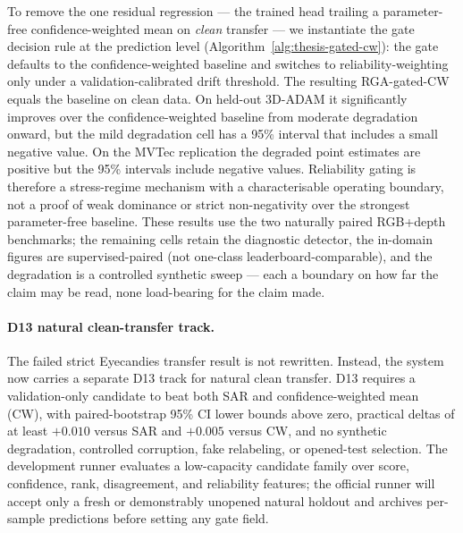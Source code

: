 \documentclass[11pt]{article}
\begin{document}
To remove the one residual regression --- the trained head trailing a
parameter-free confidence-weighted mean on \emph{clean} transfer --- we
instantiate the gate decision rule at the prediction level
(Algorithm~\ref{alg:thesis-gated-cw}): the gate defaults to the
confidence-weighted baseline and switches to reliability-weighting only under
a validation-calibrated drift threshold. The resulting RGA-gated-CW equals the
baseline on clean data. On held-out 3D-ADAM it significantly improves over the
confidence-weighted baseline from moderate degradation onward, but the mild
degradation cell has a 95\% interval that includes a small negative value. On
the MVTec replication the degraded point estimates are positive but the 95\%
intervals include negative values. Reliability gating is therefore a
stress-regime mechanism with a characterisable operating boundary, not a proof
of weak dominance or strict non-negativity over the strongest parameter-free
baseline. These results use the two naturally paired RGB+depth
benchmarks; the remaining cells retain the diagnostic detector, the in-domain
figures are supervised-paired (not one-class leaderboard-comparable), and the
degradation is a controlled synthetic sweep --- each a boundary on how far the
claim may be read, none load-bearing for the claim made.

\paragraph{D13 natural clean-transfer track.}
The failed strict Eyecandies transfer result is not rewritten. Instead, the
system now carries a separate D13 track for natural clean transfer. D13 requires
a validation-only candidate to beat both SAR and confidence-weighted mean (CW),
with paired-bootstrap 95\% CI lower bounds above zero, practical deltas of at
least $+0.010$ versus SAR and $+0.005$ versus CW, and no synthetic degradation,
controlled corruption, fake relabeling, or opened-test selection. The
development runner evaluates a low-capacity candidate family over score,
confidence, rank, disagreement, and reliability features; the official runner
will accept only a fresh or demonstrably unopened natural holdout and archives
per-sample predictions before setting any gate field.

\begin{table}[H]
\centering
\caption{D13 natural clean positive-transfer audit. Opened development results
can guide method selection but cannot set Gate E; official rows must pass both
SAR and CW.}
\label{tab:thesis-positive-transfer-d13}
\scriptsize
{}
\end{table}
\end{document}
